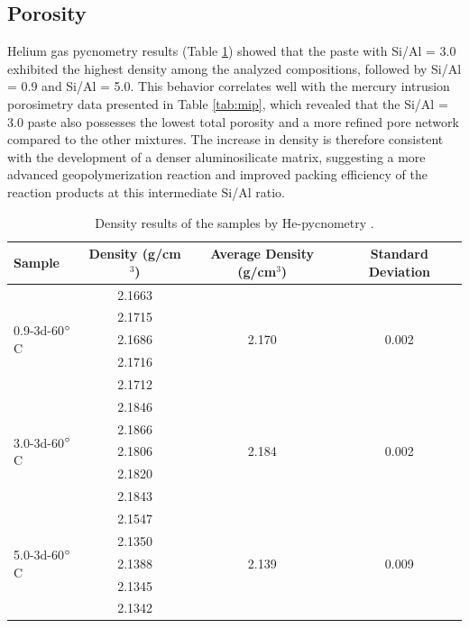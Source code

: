 \subsection{Porosity}

Helium gas pycnometry results (Table \ref{tab:he_pycnometry}) showed that the paste with Si/Al = 3.0 exhibited the highest density among the analyzed compositions, followed by Si/Al = 0.9 and Si/Al = 5.0.
This behavior correlates well with the mercury intrusion porosimetry data presented in Table \ref{tab:mip}, which revealed that the Si/Al = 3.0 paste also possesses the lowest total porosity and a more refined pore network compared to the other mixtures.
The increase in density is therefore consistent with the development of a denser aluminosilicate matrix, suggesting a more advanced geopolymerization reaction and improved packing efficiency of the reaction products at this intermediate Si/Al ratio.

\begin{table}[H]
  \centering
  \caption{Density results of the samples by He-pycnometry \label{tab:he_pycnometry}.}
  \begin{tabular}{lccc}
    \hline
    Sample & Density (g/cm$^3$) & Average Density (g/cm$^3$) & Standard Deviation \\ 
    \hline
    \multirow{5}{*}{0.9-3d-60$^{\circ}$C} 
    & 2.1663 & \multirow{5}{*}{2.170} & \multirow{5}{*}{0.002} \\
    & 2.1715 &  &  \\
    & 2.1686 &  &  \\
    & 2.1716 &  &  \\
    & 2.1712 &  &  \\ 
    \hline
    \multirow{5}{*}{3.0-3d-60$^{\circ}$C} 
    & 2.1846 & \multirow{5}{*}{2.184} & \multirow{5}{*}{0.002} \\
    & 2.1866 &  &  \\
    & 2.1806 &  &  \\
    & 2.1820 &  &  \\
    & 2.1843 &  &  \\ 
    \hline
    \multirow{5}{*}{5.0-3d-60$^{\circ}$C} 
    & 2.1547 & \multirow{5}{*}{2.139} & \multirow{5}{*}{0.009} \\
    & 2.1350 &  &  \\
    & 2.1388 &  &  \\
    & 2.1345 &  &  \\
    & 2.1342 &  &  \\ 
    \hline
  \end{tabular}
\end{table}

